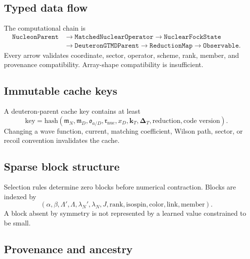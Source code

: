 \documentclass[11pt]{article}
\newcommand{\kT}{\bm{k}_{T}}
\newcommand{\DT}{\bm{\Delta}_{T}}
\newcommand{\nuc}{\mathrm{nuc}}
\begin{document}
\subsection{Typed data flow}

The computational chain is
\begin{equation}
\begin{aligned}
 \texttt{NucleonParent}
 &\longrightarrow \texttt{MatchedNuclearOperator}
 \longrightarrow \texttt{NuclearFockState}\\
 &\longrightarrow \texttt{DeuteronGTMDParent}
 \longrightarrow \texttt{ReductionMap}
 \longrightarrow \texttt{Observable}.
\end{aligned}
\label{eq:nuclear-data-flow}
\end{equation}
Every arrow validates coordinate, sector, operator, scheme, rank, member, and
provenance compatibility.  Array-shape compatibility is insufficient.

\subsection{Immutable cache keys}

A deuteron-parent cache key contains at least
\begin{equation}
 \mathrm{key}=
 \mathrm{hash}(
 \mathfrak m_N,
 \mathfrak m_D,
 \mathfrak o_{a/D},
 \mathfrak r_{\nuc},
 x_D,\kT,\DT,
 \text{reduction},
 \text{code version}).
\label{eq:nuclear-cache-key}
\end{equation}
Changing a wave function, current, matching coefficient, Wilson path, sector,
or recoil convention invalidates the cache.

\subsection{Sparse block structure}

Selection rules determine zero blocks before numerical contraction.  Blocks
are indexed by
\begin{equation}
 (\alpha,\beta,
 \Lambda',\Lambda,
 \lambda_N',\lambda_N,
 J,\text{rank},
 \text{isospin},\text{color},
 \text{link},\text{member}).
\label{eq:nuclear-block-index}
\end{equation}
A block absent by symmetry is not represented by a learned value constrained
to be small.

\subsection{Provenance and ancestry}
\end{document}
